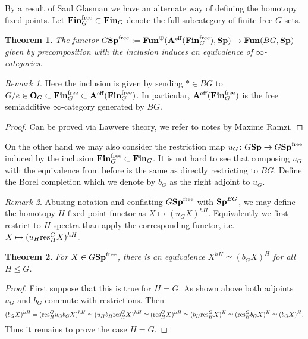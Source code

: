 \documentclass[letterpaper]{article}
\theoremstyle{definition}
\theoremstyle{remark}
\newtheorem{remark}{Remark}
\theoremstyle{plain}
\newtheorem{theorem}{Theorem}
\begin{document}
By a result of Saul Glasman we have an alternate way of defining the homotopy fixed points. Let $\mathbf{Fin}_G^{\textnormal{free}}\subset\mathbf{Fin}_G$ denote the full subcategory of finite free $G$-sets.

\begin{theorem}
		The functor $G\mathbf{Sp}^{\textnormal{free}}:=\mathbf{Fun}^\oplus(\mathbf{A}^\textnormal{eff}(\mathbf{Fin}_G^{\textnormal{free}}),\mathbf{Sp})\rightarrow\mathbf{Fun}(BG,\mathbf{Sp})$ given by precomposition with the inclusion induces an equivalence of $\infty$-categories.
\end{theorem}

\begin{remark}
		Here the inclusion is given by sending $*\in BG$ to $G/e\in\mathbf{O}_G\subset\mathbf{Fin}_G^{\textnormal{free}}\subset\mathbf{A}^\textnormal{eff}(\mathbf{Fin}_G^{\textnormal{free}})$. In particular, $\mathbf{A}^\textnormal{eff}(\mathbf{Fin}_G^{\textnormal{free}})$ is the free semiadditive $\infty$-category generated by $BG$.
\end{remark}

\begin{proof}
		Can be proved via Lawvere theory, we refer to notes by Maxime Ramzi.
\end{proof}

On the other hand we may also consider the restriction map $u_G\colon G\mathbf{Sp}\rightarrow G\mathbf{Sp}^{\textnormal{free}}$ induced by the inclusion $\mathbf{Fin}_G^{\textnormal{free}}\subset\mathbf{Fin}_G$. It is not hard to see that composing $u_G$ with the equivalence from before is the same as directly restricting to $BG$. Define the Borel completion which we denote by $b_G$ as the right adjoint to $u_G$.

\begin{remark}
		Abusing notation and conflating $G\mathbf{Sp}^{\textnormal{free}}$ with $\mathbf{Sp}^{BG}$, we may define the homotopy $H$-fixed point functor as $X\mapsto (u_G X)^{hH}$. Equivalently we first restrict to $H$-spectra than apply the corresponding functor, i.e. $X\mapsto(u_H\textnormal{res}^G_H X)^{hH}$.
\end{remark}

\begin{theorem}
		For $X\in G\mathbf{Sp}^{\textnormal{free}}$, there is an equivalence $X^{hH}\simeq(b_G X)^H$ for all $H\leq G$.
\end{theorem}

\begin{proof}
		First suppose that this is true for $H=G$. As shown above both adjoints $u_G$ and $b_G$ commute with restrictions. Then 
		$$(b_G X)^{hH} = (\textnormal{res}^G_H u_G b_G X)^{hH}\simeq(u_H b_H\textnormal{res}^G_H X)^{hH}\simeq(\textnormal{res}^G_H X)^{hH}\simeq(b_H\textnormal{res}^G_H X)^H\simeq(\textnormal{res}^G_H b_G X)^H\simeq(b_G X)^H.$$
		Thus it remains to prove the case $H=G$.
\end{proof}
\end{document}
